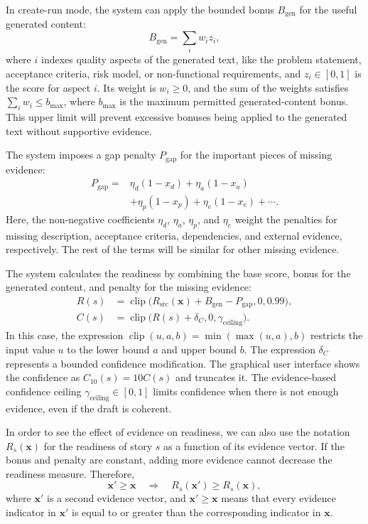 \documentclass[manuscript,review]{acmart}
\begin{document}
In create-run mode, the system can apply the bounded bonus $B_{\text{gen}}$ for the useful generated content:
\begin{equation}
	B_{\text{gen}}=\sum_i w_i z_i,
\end{equation}
where $i$ indexes quality aspects of the generated text, like the problem statement, acceptance criteria, risk model, or non-functional requirements, and $z_i\in[0,1]$ is the score for aspect $i$. Its weight is $w_i\geq0$, and the sum of the weights satisfies $\sum_i w_i\leq b_{\max}$, where $b_{\max}$ is the maximum permitted generated-content bonus. This upper limit will prevent excessive bonuses being applied to the generated text without supportive evidence.

The system imposes a gap penalty $P_{\text{gap}}$ for the important pieces of missing evidence:
\begin{equation}
	\begin{aligned}
		P_{\text{gap}} ={}& \eta_d(1-x_d)+\eta_a(1-x_a) \\
		&+\eta_p(1-x_p)+\eta_e(1-x_e)+\cdots .
	\end{aligned}
\end{equation}
Here, the non-negative coefficients $\eta_d$, $\eta_a$, $\eta_p$, and $\eta_e$ weight the penalties for missing description, acceptance criteria, dependencies, and external evidence, respectively. The rest of the terms will be similar for other missing evidence.

The system calculates the readiness by combining the base score, bonus for the generated content, and penalty for the missing evidence:
\begin{align}
	R(s) &= \operatorname{clip}
	\bigl(R_{\text{src}}(\mathbf{x})+B_{\text{gen}}-P_{\text{gap}},0,0.99\bigr), \\
	C(s) &= \operatorname{clip}
	\bigl(R(s)+\delta_C,0,\gamma_{\text{ceiling}}\bigr).
\end{align}
In this case, the expression $\operatorname{clip}(u,a,b)=\min(\max(u,a),b)$ restricts the input value $u$ to the lower bound $a$ and upper bound $b$. The expression $\delta_C$ represents a bounded confidence modification. The graphical user interface shows the confidence as $C_{10}(s)=10C(s)$ and truncates it. The evidence-based confidence ceiling $\gamma_{\text{ceiling}}\in[0,1]$ limits confidence when there is not enough evidence, even if the draft is coherent.

In order to see the effect of evidence on readiness, we can also use the notation $R_s(\mathbf{x})$ for the readiness of story $s$ as a function of its evidence vector. If the bonus and penalty are constant, adding more evidence cannot decrease the readiness measure. Therefore,
\begin{equation}
	\mathbf{x}'\geq\mathbf{x}
	\quad\Rightarrow\quad
	R_s(\mathbf{x}')\geq R_s(\mathbf{x}),
\end{equation}
where $\mathbf{x}'$ is a second evidence vector, and $\mathbf{x}'\geq\mathbf{x}$ means that every evidence indicator in $\mathbf{x}'$ is equal to or greater than the corresponding indicator in $\mathbf{x}$.
\end{document}
